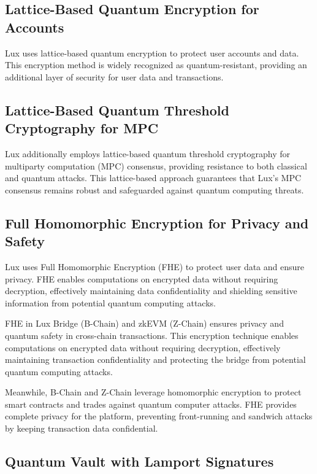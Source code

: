 \documentclass[11pt]{article}
\begin{document}
\subsection{Lattice-Based Quantum Encryption for Accounts}

Lux uses lattice-based quantum encryption to protect user accounts and data. This encryption method is widely recognized as quantum-resistant, providing an additional layer of security for user data and transactions.


\subsection{Lattice-Based Quantum Threshold Cryptography for MPC}

Lux additionally employs lattice-based quantum threshold cryptography for multiparty computation (MPC) consensus, providing resistance to both classical and quantum attacks. This lattice-based approach guarantees that Lux's MPC consensus remains robust and safeguarded against quantum computing threats.


\subsection{Full Homomorphic Encryption for Privacy and Safety}

Lux uses Full Homomorphic Encryption (FHE) to protect user data and ensure privacy. FHE enables computations on encrypted data without requiring decryption, effectively maintaining data confidentiality and shielding sensitive information from potential quantum computing attacks.


FHE in Lux Bridge (B-Chain) and zkEVM (Z-Chain) ensures privacy and quantum safety in cross-chain transactions. This encryption technique enables computations on encrypted data without requiring decryption, effectively maintaining transaction confidentiality and protecting the bridge from potential quantum computing attacks.


Meanwhile, B-Chain and Z-Chain leverage homomorphic encryption to protect smart contracts and trades against quantum computer attacks. FHE provides complete privacy for the platform, preventing front-running and sandwich attacks by keeping transaction data confidential.


\subsection{Quantum Vault with Lamport Signatures}
\end{document}
